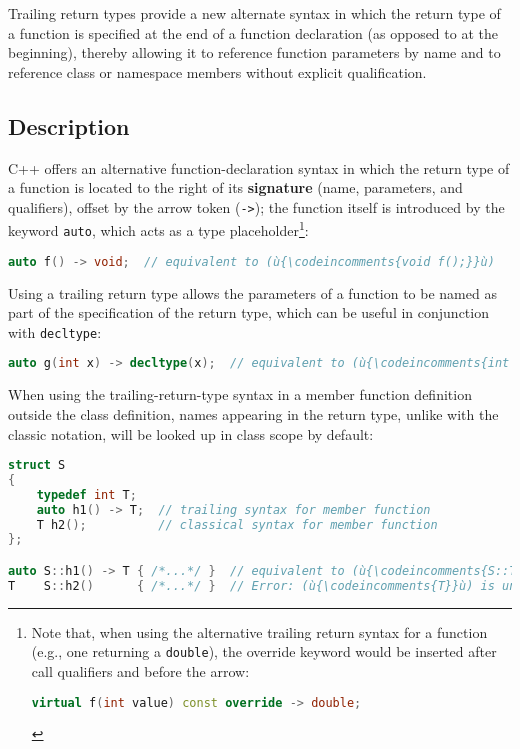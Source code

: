 

Trailing return types provide a new alternate syntax in which the return type of a function is specified at
the end of a function declaration (as opposed to at the beginning),
thereby allowing it to reference function parameters by name and to reference class
or namespace members without explicit qualification.

\subsection[Description]{Description}\label{description}

C++ offers an alternative function-declaration syntax in which the
return type of a function is located to the right of its
\textbf{signature} (name, parameters, and qualifiers), offset by the
arrow token (\texttt{->}); the function itself is introduced by the
keyword {\texttt{auto}}, which acts as a type placeholder\cprotect\footnote{Note that, when using the alternative trailing return syntax for a function (e.g., one returning a \texttt{double}), the override keyword would be inserted after call qualifiers and before the arrow:

\begin{lstlisting}[language=C++,basicstyle=\ttfamily\footnotesize]
virtual f(int value) const override -> double;
\end{lstlisting}\vspace*{-1ex}}:

\begin{lstlisting}[language=C++]
auto f() -> void;  // equivalent to (ù{\codeincomments{void f();}}ù)
\end{lstlisting}
    
\noindent Using a trailing return type allows the parameters of a function to be
named as part of the specification of the return type, which can be
useful in conjunction with {\texttt{decltype}}:

\begin{lstlisting}[language=C++]
auto g(int x) -> decltype(x);  // equivalent to (ù{\codeincomments{int g(int x);}}ù)
\end{lstlisting}
    
\noindent When using the trailing-return-type syntax in a member function
definition outside the class definition, names appearing in the return
type, unlike with the classic notation, will be looked up in class scope
by default:

\begin{lstlisting}[language=C++]
struct S
{
    typedef int T;
    auto h1() -> T;  // trailing syntax for member function
    T h2();          // classical syntax for member function
};

auto S::h1() -> T { /*...*/ }  // equivalent to (ù{\codeincomments{S::T S::h1() \{ /\*...\*/ \}}}ù)
T    S::h2()      { /*...*/ }  // Error: (ù{\codeincomments{T}}ù) is unknown in this context.
\end{lstlisting}
    

